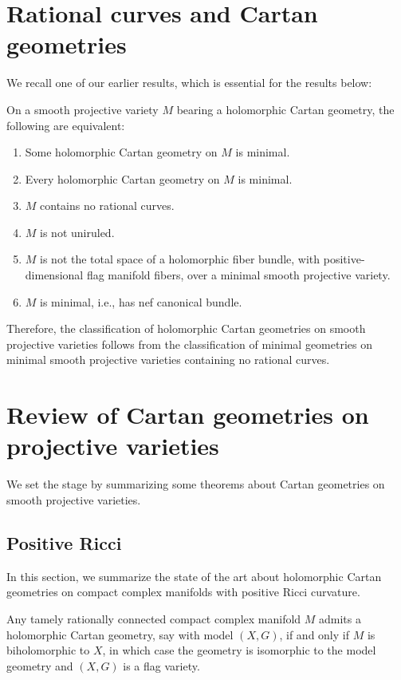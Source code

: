 \section{Rational curves and Cartan geometries}\label{section:rational.curves}
We recall one of our earlier results, which is essential for the results below:
\begin{Theorem}\label{theorem:drop}
On a smooth projective variety $M$ bearing a holomorphic Cartan geometry, the following are equivalent:
\begin{enumerate}\itemsep=0pt
\item[$(1)$]
Some holomorphic Cartan geometry on $M$ is minimal.
\item[$(2)$]
Every holomorphic Cartan geometry on $M$ is minimal.
\item[$(3)$]
$M$ contains no rational curves.
\item[$(4)$]
$M$ is not uniruled.
\item[$(5)$]
$M$ is not the total space of a holomorphic fiber bundle, with positive-dimensional flag manifold fibers, over a
minimal smooth projective variety.
\item[$(6)$]
$M$ is minimal, i.e., has nef canonical bundle.
\end{enumerate}
\end{Theorem}
Therefore, the classification of holomorphic Cartan geometries on smooth projective varieties follows from the classification of minimal geometries on minimal smooth projective varieties containing no rational curves.

\section{Review of Cartan geometries on projective varieties}\label{sec:Cartan.on.proj}
We set the stage by summarizing some theorems about Cartan geometries on smooth projective varieties.

\subsection{Positive Ricci}
In this section, we summarize the state of the art about holomorphic Cartan geometries on compact complex manifolds with positive Ricci curvature.
\begin{Theorem}
Any tamely rationally connected compact complex manifold $M$ admits a holomorphic Cartan geometry, say with model $(X, G)$, if and only if $M$ is biholomorphic to $X$, in which case the geometry is isomorphic to the model geometry and $(X, G)$ is a flag variety.
\end{Theorem}

